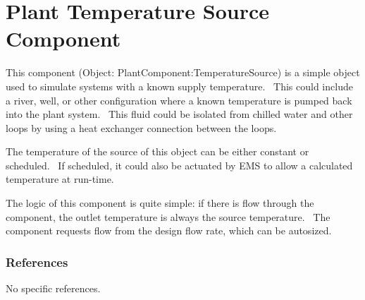 \section{Plant Temperature Source Component }\label{plant-temperature-source-component}

This component (Object: PlantComponent:TemperatureSource) is a simple object used to simulate systems with a known supply temperature.~ This could include a river, well, or other configuration where a known temperature is pumped back into the plant system.~ This fluid could be isolated from chilled water and other loops by using a heat exchanger connection between the loops.

The temperature of the source of this object can be either constant or scheduled.~ If scheduled, it could also be actuated by EMS to allow a calculated temperature at run-time.

The logic of this component is quite simple: if there is flow through the component, the outlet temperature is always the source temperature.~ The component requests flow from the design flow rate, which can be autosized.

\subsubsection{References}\label{references-038}

No specific references. 
